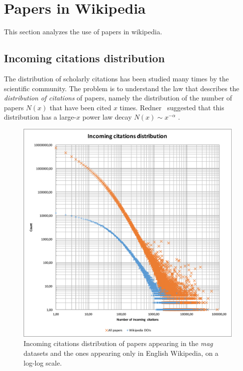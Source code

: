 \section{Papers in Wikipedia}
This section analyzes the use of papers in wikipedia.

\subsection{Incoming citations distribution}
The distribution of scholarly citations has been studied many times by the scientific community.
The problem is to understand the law that describes the \emph{distribution of citations} of papers, namely the distribution of the number of papers $N(x)$ that have been cited $x$ times.
Redner~\cite{Redner1998} suggested that this distribution has a large-$x$ power law decay $N(x) \sim x^{-\alpha}$ .

\begin{figure}[h]
\centering
\includegraphics[keepaspectratio=true, width=\textwidth]{assets/incoming_cits_loglog}
\caption{Incoming citations distribution of papers appearing in the \emph{mag} datasets and the ones appearing only in English Wikipedia, on a log-log scale.}
\label{fig:incoming_citations_loglog}
\end{figure}

